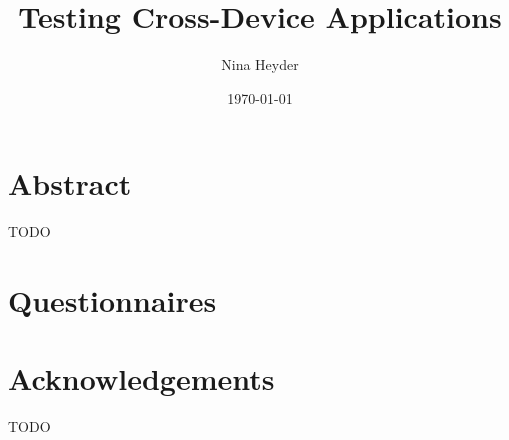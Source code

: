\documentclass[11pt,a4paper]{globis-book}
\title{Testing Cross-Device Applications}
\author{Nina Heyder}
\institute{Institute of Information Systems}
\date{\today}
\begin{document}
\frontmatter
\maketitlepage
\cleardoublepage
{}

\chapter*{Abstract}

TODO

\tableofcontents

\mainmatter









\appendix
\chapter{Questionnaires}
\label{sec:questionnaires}
\newpage

\newpage

\newpage

\newpage


\listoffigures
\listoftables

\chapter*{Acknowledgements}

TODO

\newpage
\thispagestyle{empty}



\end{document}
